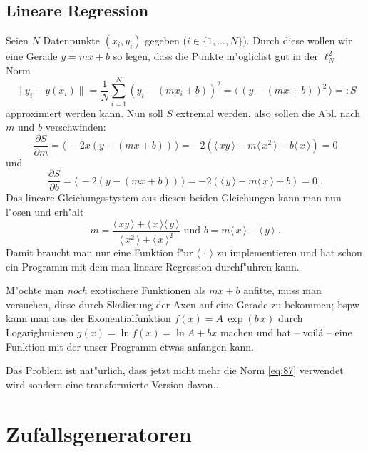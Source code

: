 \documentclass[a4paper]{book}
\newcommand{\abs}{\bigskip \noindent}
\newcommand{\mittel}[1]{\ensuremath{\langle  \, #1 \,  \rangle}}
\begin{document}
\subsection{Lineare Regression}
\label{sec:lineare_regression}

Seien $N$ Datenpunkte $(x_i, y_i)$ gegeben ($i \in \{ 1, ..., N
\}$). Durch diese wollen wir eine Gerade $y = m x + b$ so legen, dass
die Punkte m"oglichst gut in der $\ell^2_N$ Norm
\begin{equation}
  \label{eq:87}
  \| y_i - y(x_i) \| = \frac{1}{N} \sum_{i = 1}^N ( y_i - (mx_i +b)
  )^2 =
\mittel{  ( y - (mx +b))^2 }
=: S
\end{equation}
approximiert werden kann. Nun soll $S$ extremal werden, also sollen
die Abl. nach $m$ und $b$ verschwinden:
\begin{equation*}
  \frac{\partial S}{\partial m} = \mittel{  -2x ( y - (mx +b)) }
= -2 \left (\mittel{ xy } - m \mittel{ x^2 } - b \mittel x \right ) = 0
\end{equation*}
und
\begin{equation*}
  \frac{\partial S}{\partial b} = \mittel{ -2 (y-(mx+b)) } = -2 \left(
    \mittel y - m \mittel x + b \right ) = 0 \;.
\end{equation*}
Das lineare Gleichungsstystem aus diesen beiden Gleichungen kann man
nun l"osen und erh"alt
\begin{equation}
  \label{eq:88}
  m = \frac{\mittel{ xy} + \mittel{x} \mittel y}{\mittel{ x^2 } +
    \mittel{x}^2} \text{ und } b = m \mittel x - \mittel y \;.
\end{equation}
Damit braucht man nur eine Funktion f"ur $\mittel \cdot$ zu
implementieren und hat schon ein Programm mit dem man lineare
Regression durchf"uhren kann.

\abs
M"ochte man \emph{noch} exotischere Funktionen als $mx + b$ anfitte,
muss man versuchen, diese durch Skalierung der Axen auf eine Gerade zu
bekommen; bspw kann man aus der Exonentialfunktion $f(x) = A\, \exp(b
\, x)$ durch Logarighmieren $g(x) = \ln f(x) = \ln A + b x$ machen und
hat -- voil\'a -- eine Funktion mit der unser Programm etwas anfangen
kann. 

Das Problem ist nat"urlich, dass jetzt nicht mehr die Norm
\eqref{eq:87} verwendet wird sondern eine transformierte Version
davon...




\section{Zufallsgeneratoren}
\label{sec:zufallsgeneratoren}
\end{document}
